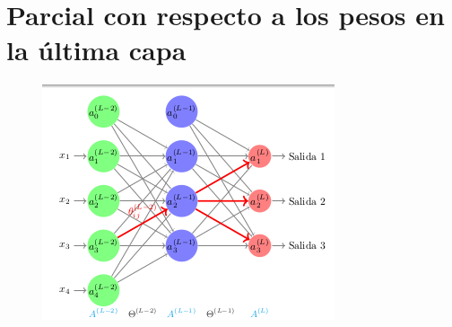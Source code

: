 \section{Parcial con respecto a los pesos en la última capa}

\begin{figure}[H]
 \centering
 \includegraphics[scale=0.8]{../Figuras/AredN.png}
 \label{fig:graficaLog}
\end{figure}


